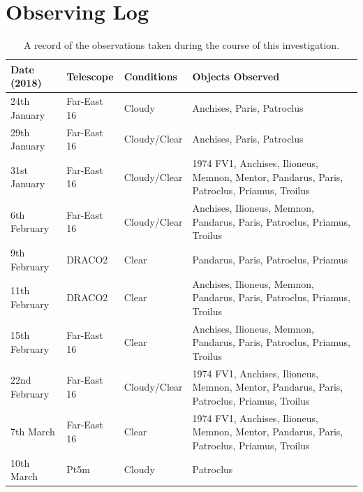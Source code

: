 \documentclass[10pt, twocolumn]{revtex4}    %
\begin{document}

\vspace{1ex}
%
%
%
\normalem

\clearpage
\appendix

\section{Observing Log}

\begin{table}[h]
\centering
\begin{tabularx}{0.5\textwidth}{ Z Z Z Y }
\hline
\hline

Date (2018) & Telescope & Conditions & Objects Observed \\ \hline 
24th January & Far-East 16 & Cloudy & Anchises, Paris, Patroclus \\ \hline

29th January & Far-East 16 & Cloudy/Clear & Anchises, Paris, Patroclus \\ \hline

31st January & Far-East 16 & Cloudy/Clear & 1974 FV1, Anchises, Ilioneus, Memnon, Mentor, Pandarus, Paris, Patroclus, Priamus, Troilus \\ \hline

6th February & Far-East 16 & Cloudy/Clear & Anchises, Ilioneus, Memnon, Pandarus, Paris, Patroclus, Priamus, Troilus \\ \hline

9th February & DRACO2 & Clear & Pandarus, Paris, Patroclus, Priamus \\ \hline

11th February & DRACO2 & Clear & Anchises, Ilioneus, Memnon, Pandarus, Paris, Patroclus, Priamus, Troilus \\ \hline

15th February & Far-East 16 & Clear & Anchises, Ilioneus, Memnon, Pandarus, Paris, Patroclus, Priamus, Troilus \\ \hline

22nd February & Far-East 16 & Cloudy/Clear & 1974 FV1, Anchises, Ilioneus, Memnon, Mentor, Pandarus, Paris, Patroclus, Priamus, Troilus \\ \hline

7th March & Far-East 16 & Clear & 1974 FV1, Anchises, Ilioneus, Memnon, Mentor, Pandarus, Paris, Patroclus, Priamus, Troilus \\ \hline

10th March & Pt5m & Cloudy & Patroclus \\ \hline

\end{tabularx}
\caption{A record of the observations taken during the course of this investigation.}
\label{tab: observing log}
\end{table} 
\end{document}
